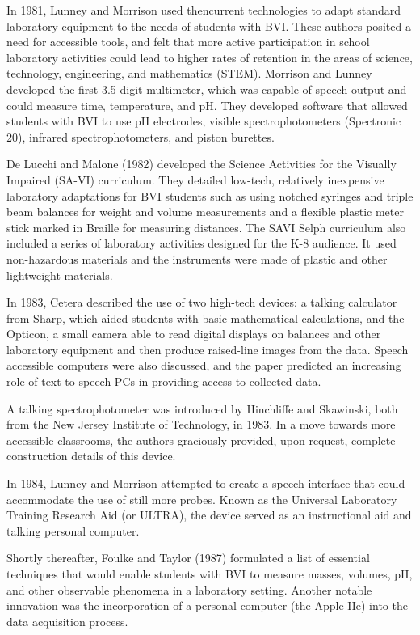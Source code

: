 \documentclass[11.5pt]{sig-alternate} %
\begin{document}
\begin{large}
In 1981, Lunney and Morrison used thencurrent technologies to adapt standard laboratory equipment to the needs of students with BVI. These authors posited a need for accessible tools, and felt that more active participation in school laboratory activities could lead to higher rates of retention in the areas of science, technology, engineering, and mathematics (STEM). Morrison and Lunney developed the first 3.5 digit multimeter, which was capable of speech output and could measure time, temperature, and pH.  They developed software that allowed students with BVI to use pH electrodes, visible spectrophotometers (Spectronic 20), infrared spectrophotometers, and piston burettes.  
 
De Lucchi and Malone (1982) developed the Science Activities for the Visually Impaired (SA-VI) curriculum.  They detailed low-tech, relatively inexpensive laboratory adaptations for BVI students such as using notched syringes and triple beam balances for weight and volume measurements and a flexible plastic meter stick marked in Braille for measuring distances. The SAVI Selph curriculum also included a series of laboratory activities designed for the K-8 audience.  It used non-hazardous materials and the instruments were made of plastic and other lightweight materials. 
 
In 1983, Cetera described the use of two high-tech devices:  a talking calculator from Sharp, which aided students with basic mathematical calculations, and the Opticon, a small camera able to read digital displays on balances and other laboratory equipment and then produce raised-line images from the data. Speech accessible computers were also discussed, and the paper predicted an increasing role of text-to-speech PCs in providing access to collected data. 
 
A talking spectrophotometer was introduced by Hinchliffe and Skawinski, both from the New Jersey Institute of Technology, in 1983. In a move towards more accessible classrooms, the authors graciously provided, upon request, complete construction details of this device.  
 
In 1984, Lunney and Morrison attempted to create a speech interface that could accommodate the use of still more probes. Known as the Universal Laboratory Training Research Aid (or ULTRA), the device served as an instructional aid and talking personal computer. 
 
Shortly thereafter, Foulke and Taylor (1987) formulated a list of essential techniques that would enable students with BVI to measure masses, volumes, pH, and other observable phenomena in a laboratory setting. Another notable innovation was the incorporation of a personal computer (the Apple IIe) into the data acquisition process. 
 

\end{large}
\end{document}
